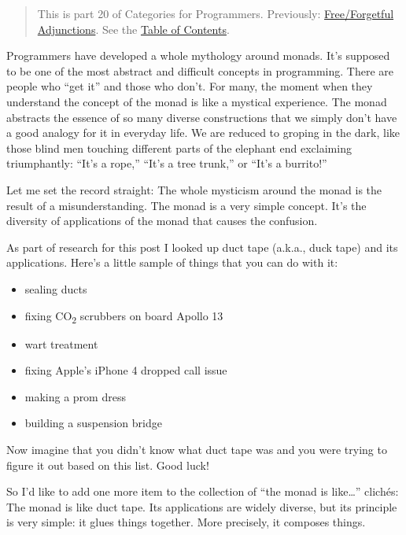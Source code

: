 \begin{quote}
This is part 20 of Categories for Programmers. Previously:
\href{https://bartoszmilewski.com/2016/06/15/freeforgetful-adjunctions/}{Free/Forgetful
Adjunctions}. See the
\href{https://bartoszmilewski.com/2014/10/28/category-theory-for-programmers-the-preface/}{Table
of Contents}.
\end{quote}

Programmers have developed a whole mythology around monads. It's
supposed to be one of the most abstract and difficult concepts in
programming. There are people who ``get it'' and those who don't. For
many, the moment when they understand the concept of the monad is like a
mystical experience. The monad abstracts the essence of so many diverse
constructions that we simply don't have a good analogy for it in
everyday life. We are reduced to groping in the dark, like those blind
men touching different parts of the elephant end exclaiming
triumphantly: ``It's a rope,'' ``It's a tree trunk,'' or ``It's a
burrito!''

Let me set the record straight: The whole mysticism around the monad is
the result of a misunderstanding. The monad is a very simple concept.
It's the diversity of applications of the monad that causes the
confusion.

As part of research for this post I looked up duct tape (a.k.a., duck
tape) and its applications. Here's a little sample of things that you
can do with it:

\begin{itemize}
\tightlist
\item
  sealing ducts
\item
  fixing CO\textsubscript{2} scrubbers on board Apollo 13
\item
  wart treatment
\item
  fixing Apple's iPhone 4 dropped call issue
\item
  making a prom dress
\item
  building a suspension bridge
\end{itemize}

Now imagine that you didn't know what duct tape was and you were trying
to figure it out based on this list. Good luck!

So I'd like to add one more item to the collection of ``the monad is
like\ldots{}'' clichés: The monad is like duct tape. Its applications
are widely diverse, but its principle is very simple: it glues things
together. More precisely, it composes things.

